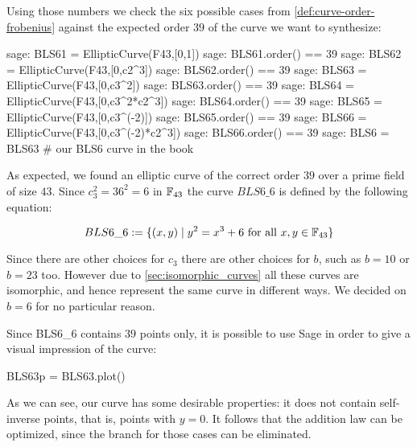 Using those numbers we check the six possible cases from \ref{def:curve-order-frobenius} against the expected order $39$ of the curve we want to synthesize:

\begin{sagecommandline}
sage: BLS61 = EllipticCurve(F43,[0,1])
sage: BLS61.order() == 39
sage: BLS62 = EllipticCurve(F43,[0,c2^3])
sage: BLS62.order() == 39
sage: BLS63 = EllipticCurve(F43,[0,c3^2])
sage: BLS63.order() == 39
sage: BLS64 = EllipticCurve(F43,[0,c3^2*c2^3])
sage: BLS64.order() == 39
sage: BLS65 = EllipticCurve(F43,[0,c3^(-2)])
sage: BLS65.order() == 39
sage: BLS66 = EllipticCurve(F43,[0,c3^(-2)*c2^3])
sage: BLS66.order() == 39
sage: BLS6 = BLS63 # our BLS6 curve in the book
\end{sagecommandline}
As expected, we found an elliptic curve of the correct order $39$ over a prime field of size $43$. Since $c_3^2=36^2=6$ in $\mathbb{F}_{43}$ the curve $BLS6\_6$ is defined by the following equation:

\begin{equation}
BLS6\_6 := \{(x,y)\;|\; y^2 = x^3 + 6 \text{ for all } x,y \in \mathbb{F}_{43}\}
\end{equation}

Since there are other choices for $c_3$ there are other choices for $b$, such as $b=10$ or $b=23$ too. However due to \ref{sec:isomorphic_curves} all these curves are isomorphic, and hence represent the same curve in different ways. We decided on $b=6$ for no particular reason.

Since BLS6\_6 contains $39$ points only, it is possible to use Sage in order to give a visual impression of the curve:

\begin{sagesilent}
BLS63p = BLS63.plot()
\end{sagesilent}
\begin{center} 
\end{center}

As we can see, our curve has some desirable properties: it does not contain self-inverse points, that is, points with $y=0$. It follows that the addition law can be optimized, since the branch for those cases can be eliminated. 

